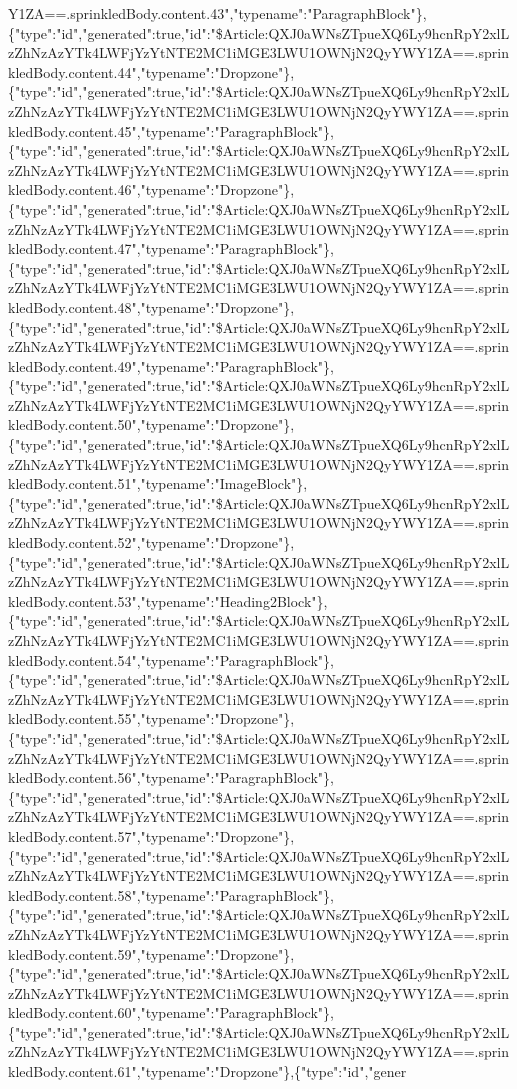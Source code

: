 Y1ZA==.sprinkledBody.content.43","typename":"ParagraphBlock"\},\{"type":"id","generated":true,"id":"\$Article:QXJ0aWNsZTpueXQ6Ly9hcnRpY2xlLzZhNzAzYTk4LWFjYzYtNTE2MC1iMGE3LWU1OWNjN2QyYWY1ZA==.sprinkledBody.content.44","typename":"Dropzone"\},\{"type":"id","generated":true,"id":"\$Article:QXJ0aWNsZTpueXQ6Ly9hcnRpY2xlLzZhNzAzYTk4LWFjYzYtNTE2MC1iMGE3LWU1OWNjN2QyYWY1ZA==.sprinkledBody.content.45","typename":"ParagraphBlock"\},\{"type":"id","generated":true,"id":"\$Article:QXJ0aWNsZTpueXQ6Ly9hcnRpY2xlLzZhNzAzYTk4LWFjYzYtNTE2MC1iMGE3LWU1OWNjN2QyYWY1ZA==.sprinkledBody.content.46","typename":"Dropzone"\},\{"type":"id","generated":true,"id":"\$Article:QXJ0aWNsZTpueXQ6Ly9hcnRpY2xlLzZhNzAzYTk4LWFjYzYtNTE2MC1iMGE3LWU1OWNjN2QyYWY1ZA==.sprinkledBody.content.47","typename":"ParagraphBlock"\},\{"type":"id","generated":true,"id":"\$Article:QXJ0aWNsZTpueXQ6Ly9hcnRpY2xlLzZhNzAzYTk4LWFjYzYtNTE2MC1iMGE3LWU1OWNjN2QyYWY1ZA==.sprinkledBody.content.48","typename":"Dropzone"\},\{"type":"id","generated":true,"id":"\$Article:QXJ0aWNsZTpueXQ6Ly9hcnRpY2xlLzZhNzAzYTk4LWFjYzYtNTE2MC1iMGE3LWU1OWNjN2QyYWY1ZA==.sprinkledBody.content.49","typename":"ParagraphBlock"\},\{"type":"id","generated":true,"id":"\$Article:QXJ0aWNsZTpueXQ6Ly9hcnRpY2xlLzZhNzAzYTk4LWFjYzYtNTE2MC1iMGE3LWU1OWNjN2QyYWY1ZA==.sprinkledBody.content.50","typename":"Dropzone"\},\{"type":"id","generated":true,"id":"\$Article:QXJ0aWNsZTpueXQ6Ly9hcnRpY2xlLzZhNzAzYTk4LWFjYzYtNTE2MC1iMGE3LWU1OWNjN2QyYWY1ZA==.sprinkledBody.content.51","typename":"ImageBlock"\},\{"type":"id","generated":true,"id":"\$Article:QXJ0aWNsZTpueXQ6Ly9hcnRpY2xlLzZhNzAzYTk4LWFjYzYtNTE2MC1iMGE3LWU1OWNjN2QyYWY1ZA==.sprinkledBody.content.52","typename":"Dropzone"\},\{"type":"id","generated":true,"id":"\$Article:QXJ0aWNsZTpueXQ6Ly9hcnRpY2xlLzZhNzAzYTk4LWFjYzYtNTE2MC1iMGE3LWU1OWNjN2QyYWY1ZA==.sprinkledBody.content.53","typename":"Heading2Block"\},\{"type":"id","generated":true,"id":"\$Article:QXJ0aWNsZTpueXQ6Ly9hcnRpY2xlLzZhNzAzYTk4LWFjYzYtNTE2MC1iMGE3LWU1OWNjN2QyYWY1ZA==.sprinkledBody.content.54","typename":"ParagraphBlock"\},\{"type":"id","generated":true,"id":"\$Article:QXJ0aWNsZTpueXQ6Ly9hcnRpY2xlLzZhNzAzYTk4LWFjYzYtNTE2MC1iMGE3LWU1OWNjN2QyYWY1ZA==.sprinkledBody.content.55","typename":"Dropzone"\},\{"type":"id","generated":true,"id":"\$Article:QXJ0aWNsZTpueXQ6Ly9hcnRpY2xlLzZhNzAzYTk4LWFjYzYtNTE2MC1iMGE3LWU1OWNjN2QyYWY1ZA==.sprinkledBody.content.56","typename":"ParagraphBlock"\},\{"type":"id","generated":true,"id":"\$Article:QXJ0aWNsZTpueXQ6Ly9hcnRpY2xlLzZhNzAzYTk4LWFjYzYtNTE2MC1iMGE3LWU1OWNjN2QyYWY1ZA==.sprinkledBody.content.57","typename":"Dropzone"\},\{"type":"id","generated":true,"id":"\$Article:QXJ0aWNsZTpueXQ6Ly9hcnRpY2xlLzZhNzAzYTk4LWFjYzYtNTE2MC1iMGE3LWU1OWNjN2QyYWY1ZA==.sprinkledBody.content.58","typename":"ParagraphBlock"\},\{"type":"id","generated":true,"id":"\$Article:QXJ0aWNsZTpueXQ6Ly9hcnRpY2xlLzZhNzAzYTk4LWFjYzYtNTE2MC1iMGE3LWU1OWNjN2QyYWY1ZA==.sprinkledBody.content.59","typename":"Dropzone"\},\{"type":"id","generated":true,"id":"\$Article:QXJ0aWNsZTpueXQ6Ly9hcnRpY2xlLzZhNzAzYTk4LWFjYzYtNTE2MC1iMGE3LWU1OWNjN2QyYWY1ZA==.sprinkledBody.content.60","typename":"ParagraphBlock"\},\{"type":"id","generated":true,"id":"\$Article:QXJ0aWNsZTpueXQ6Ly9hcnRpY2xlLzZhNzAzYTk4LWFjYzYtNTE2MC1iMGE3LWU1OWNjN2QyYWY1ZA==.sprinkledBody.content.61","typename":"Dropzone"\},\{"type":"id","gener